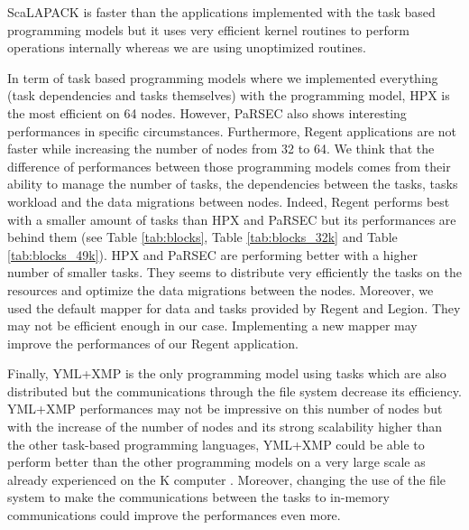 ScaLAPACK is faster than the applications implemented with the task based programming models but it uses very efficient kernel routines to perform operations internally whereas we are using unoptimized routines.

In term of task based programming models where we implemented everything (task dependencies and tasks themselves) with the programming model, HPX is the most efficient on 64 nodes.
However, PaRSEC also shows interesting performances in specific circumstances.
Furthermore, Regent applications are not faster while increasing the number of nodes from 32 to 64.
We think that the difference of performances between those programming models comes from their ability to manage the number of tasks, the dependencies between the tasks, tasks workload and the data migrations between nodes.
Indeed, Regent performs best with a smaller amount of tasks than HPX and PaRSEC but its performances are behind them (see Table \ref{tab:blocks}, Table \ref{tab:blocks_32k} and Table \ref{tab:blocks_49k}).
HPX and PaRSEC are performing better with a higher number of smaller tasks.
They seems to distribute very efficiently the tasks on the resources and optimize the data migrations between the nodes.
Moreover, we used the default mapper for data and tasks provided by Regent and Legion.
They may not be efficient enough in our case.
Implementing a new mapper may improve the performances of our Regent application.

Finally, YML+XMP is the only programming model using tasks which are also distributed but the communications through the file system decrease its efficiency.
YML+XMP performances may not be impressive on this number of nodes but with the increase of the number of nodes and its strong scalability higher than the other task-based programming languages, YML+XMP could be able to perform better than the other programming models on a very large scale as already experienced on the K computer \cite{GuTPS2019}.
Moreover, changing the use of the file system to make the communications between the tasks to in-memory communications could improve the performances even more.

